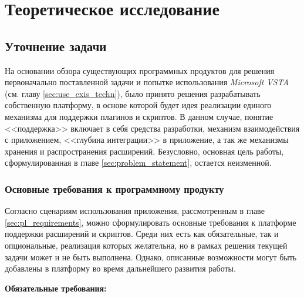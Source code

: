 \section{Теоретическое исследование}





\subsection{Уточнение задачи}

На основании обзора существующих программных продуктов для решения первоначально поставленной задачи и попытке использования {\it Microsoft VSTA}~\cite{vsta-website} (см. главу \ref{sec:use_exis_techn}), было принято решения разрабатывать собственную платформу, в основе которой будет идея реализации единого механизма для поддержки плагинов и скриптов. В данном случае, понятие <<поддержка>> включает в себя средства разработки, механизм взаимодействия с приложением, <<глубина интеграции>> в приложение, а так же механизмы хранения и распространения расширений. Безусловно, основная цель работы, сформулированная в главе \ref{sec:problem_statement}, остается неизменной.

\subsubsection{Основные требования к программному продукту}

Согласно сценариям использования приложения, рассмотренным в главе \ref{sec:pl_requirements}, можно сформулировать основные требования к платформе поддержки расширений и скриптов. Среди них есть как обязательные, так и опциональные, реализация которых желательна, но в рамках решения текущей задачи может и не быть выполнена. Однако, описанные возможности могут быть добавлены в платформу во время дальнейшего развития работы.

{\bf Обязательные требования:}

